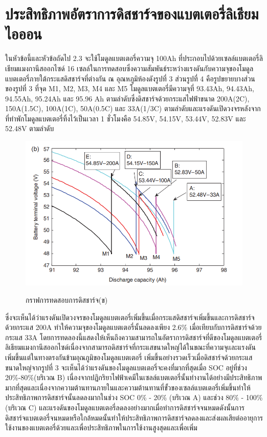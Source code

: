 \section{ประสิทธิภาพอัตราการดิสชาร์จของแบตเตอรี่ลิเธียมไอออน}
ในหัวข้อนี้และหัวข้อถัดไป 2.3 จะใช้โมดูลแบตเตอรี่ความจุ 100Ah ที่ประกอบไปด้วยเซลล์แบตเตอรี่ลิเธียมแมงกานีสออกไซด์ 16 เซลล์ในการทดสอบซึ่งความสัมพันธ์ระหว่างแรงดันกับความจุของโมดูลแบตเตอรี่ภายใต้กระแสดิสชาร์จที่ต่างกัน ณ อุณหภูมิห้องดังรูปที่ 3 ส่วนรูปที่ 4 คือรูปขยายบางส่วนของรูปที่ 3 ที่จุด M1, M2, M3, M4 และ M5 โมดูลแบตเตอรี่มีความจุที่ 93.43Ah, 94.43Ah, 94.55Ah, 95.24Ah และ 95.96 Ah ตามลำดับซึ่งดิสชาร์จด้วยกระแสไฟฟ้าขนาด 200A(2C), 150A(1.5C), 100A(1C), 50A(0.5C) และ 33A(1/3C) ตามลำดับและแรงดันเปิดวงจรหลังจากที่ทำพักโมดูลแบตเตอรี่ทิ้งไว้เป็นเวลา 1 ชั่วโมงคือ 54.85V, 54.15V, 53.44V, 52.83V และ 52.48V ตามลำดับ
\begin{center}
	\begin{figure}[H]
		\includegraphics[width=0.6\linewidth]{Chapters/img/IV_b.png}
			\centering
			\captionsetup{justification=centering,margin=2cm}
			\caption{กราฟการทดสอบการดิสชาร์จ(ข)}
			\cite{jiangzhang2015}
	\end{figure}
\end{center}
ซึ่งจะเห็นได้ว่าแรงดันเปิดวงจรของโมดูลแบตเตอรี่เพิ่มขึ้นเมื่อกระแสดิสชาร์จเพิ่มขึ้นและการดิสชาร์จด้วยกระแส 200A ทำให้ความจุของโมดูลแบตเตอรี่นั้นลดลงเพียง 2.6\% เมื่อเทียบกับการดิสชาร์จด้วยกระแส 33A โดยการทดลองนี้แสดงให้เห็นถึงความสามารถในอัตราการดิสชาร์จที่ดีของโมดูลแบตเตอรี่ลิเธียมแมงกานีสออกไซด์เนื่องจากสามารถดิสชาร์จที่กระแสขนาดใหญ่ได้ในขณะที่ความจุเเละแรงดันเพิ่มขึ้นแต่ในทางตรงกันข้ามอุณภูมิของโมดูลแบตเตอรี่
เพิ่มขึ้นอย่างรวดเร็วเมื่อดิสชาร์จด้วยกระแสขนาดใหญ่จากรูปที่ 3 จะเห็นได้ว่าแรงดันของโมดูลแบตเตอรี่จะคงที่มากที่สุดเมื่อ SOC อยู่ที่ช่วง 20\%-80\%(บริเวณ B) เนื่องจากปฏิกริยาไฟฟ้าเคมีในเซลล์แบตเตอรี่นั้นทำงานได้อย่างมีประสิทธิภาพมากที่สุดและเนื่องจากความต้านทานภายในและความต้านทานที่ขั้วของเซลล์แบตเตอรี่เพิ่มขึ้นทำให้ประสิทธิภาพการดิสชาร์จนั้นลดลงมากในช่วง SOC 0\% - 20\%
(บริเวณ A) และช่วง 80\% - 100\%(บริเวณ C) และแรงดันของโมดูลแบตเตอรี่ลดลงอย่างมากเมื่อทำการดิสชาร์จจนหมดดังนั้นการ\\ดิสชาร์จแบตเตอรี่จนหมดหรือใกล้หมดนั้นทำให้ประสิทธิภาพการดิสชาร์จลดลงและส่งผลเสียต่ออายุการใช้งานของแบตเตอรี่ด้วยและเพื่อประสิทธิภาพในการใช้งานสูงสุดและเพื่อเพิ่ม
